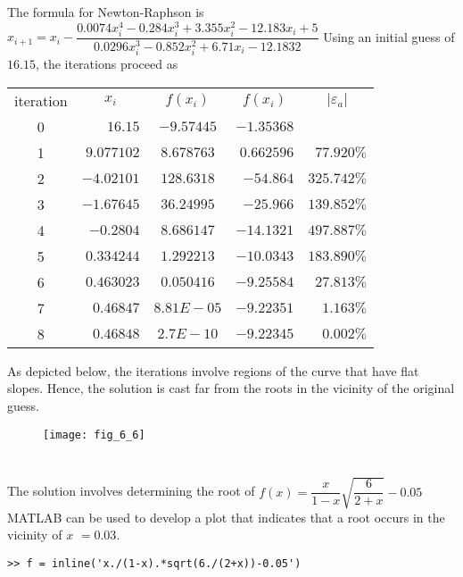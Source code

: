 \documentclass[../main.tex]{subfiles}
\begin{document}
\begin{enumerate}[label=\bfseries(\alph*)]
\section{}
The formula for Newton-Raphson is
\bigbreak
$x_{i+1}=x_{i}-\dfrac{0.0074 x_{i}^{4}-0.284 x_{i}^{3}+3.355 x_{i}^{2}-12.183 x_{i}+5}{0.0296 x_{i}^{3}-0.852 x_{i}^{2}+6.71 x_{i}-12.1832}$
\bigbreak
Using an initial guess of $16.15$, the iterations proceed as
\bigbreak
\begin{tabular}{crcrr}
iteration & \multicolumn{1}{c}{$x_{i}$} & $f\left(x_{i}\right)$ & \multicolumn{1}{c}{$f\left(x_{i}\right)$} & \multicolumn{1}{c}{$\left|\varepsilon_{a}\right|$} \\
0 & $16.15$ & $-9.57445$ & $-1.35368$ &  \\
1 & $9.077102$ & $8.678763$ & $0.662596$ & $77.920 \%$ \\
2 & $-4.02101$ & $128.6318$ & $-54.864$ & $325.742 \%$ \\
3 & $-1.67645$ & $36.24995$ & $-25.966$ & $139.852 \%$ \\
4 & $-0.2804$ & $8.686147$ & $-14.1321$ & $497.887 \%$ \\
5 & $0.334244$ & $1.292213$ & $-10.0343$ & $183.890 \%$ \\
6 & $0.463023$ & $0.050416$ & $-9.25584$ & $27.813 \%$ \\
7 & $0.46847$ & $8.81 E-05$ & $-9.22351$ & $1.163 \%$ \\
8 & $0.46848$ & $2.7 E-10$ & $-9.22345$ & $0.002 \%$ \\
\end{tabular}
\bigbreak
As depicted below, the iterations involve regions of the curve that have flat slopes. Hence, the solution is cast far from the roots in the vicinity of the original guess.
\bigbreak
\begin{figure}[H]
		\hspace*{0.8cm}\texttt{[image: fig\_6\_6]}
		\label{fig:fig_6_6}
	\end{figure}
	\bigbreak


\section{}
The solution involves determining the root of
\bigbreak
$f(x)=\dfrac{x}{1-x} \sqrt{\dfrac{6}{2+x}}-0.05$
\bigbreak
MATLAB can be used to develop a plot that indicates that a root occurs in the vicinity of $x$ $=0.03$.

\begin{lstlisting}[numbers=none]
>> f = inline('x./(1-x).*sqrt(6./(2+x))-0.05')


\end{lstlisting}
\end{enumerate}
\end{document}
